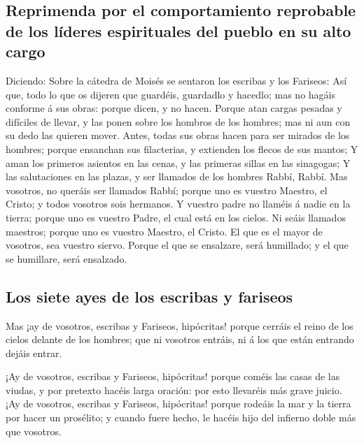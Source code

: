 \hypertarget{reprimenda-por-el-comportamiento-reprobable-de-los-luxedderes-espirituales-del-pueblo-en-su-alto-cargo}{%
\subsection{Reprimenda por el comportamiento reprobable de los líderes
espirituales del pueblo en su alto
cargo}\label{reprimenda-por-el-comportamiento-reprobable-de-los-luxedderes-espirituales-del-pueblo-en-su-alto-cargo}}

 Diciendo: Sobre la cátedra de Moisés se sentaron los
escribas y los Fariseos:  Así que, todo lo que os dijeren
que guardéis, guardadlo y hacedlo; mas no hagáis conforme á sus obras:
porque dicen, y no hacen.  Porque atan cargas pesadas y
difíciles de llevar, y las ponen sobre los hombros de los hombres; mas
ni aun con su dedo las quieren mover.  Antes, todas sus
obras hacen para ser mirados de los hombres; porque ensanchan sus
filacterias, y extienden los flecos de sus mantos;  Y aman
los primeros asientos en las cenas, y las primeras sillas en las
sinagogas;  Y las salutaciones en las plazas, y ser llamados
de los hombres Rabbí, Rabbí.  Mas vosotros, no queráis ser
llamados Rabbí; porque uno es vuestro Maestro, el Cristo; y todos
vosotros sois hermanos.  Y vuestro padre no llaméis á nadie
en la tierra; porque uno es vuestro Padre, el cual está en los cielos.
 Ni seáis llamados maestros; porque uno es vuestro Maestro,
el Cristo.  El que es el mayor de vosotros, sea vuestro
siervo.  Porque el que se ensalzare, será humillado; y el
que se humillare, será ensalzado.

\hypertarget{los-siete-ayes-de-los-escribas-y-fariseos}{%
\subsection{Los siete ayes de los escribas y
fariseos}\label{los-siete-ayes-de-los-escribas-y-fariseos}}

 Mas ¡ay de vosotros, escribas y Fariseos, hipócritas!
porque cerráis el reino de los cielos delante de los hombres; que ni
vosotros entráis, ni á los que están entrando dejáis entrar.

 ¡Ay de vosotros, escribas y Fariseos, hipócritas! porque
coméis las casas de las viudas, y por pretexto hacéis larga oración: por
esto llevaréis más grave juicio.  ¡Ay de vosotros, escribas
y Fariseos, hipócritas! porque rodeáis la mar y la tierra por hacer un
prosélito; y cuando fuere hecho, le hacéis hijo del infierno doble más
que vosotros.

